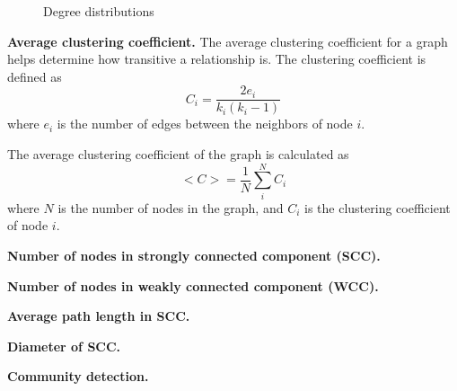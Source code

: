 \begin{figure}
    \qquad
    \caption{Degree distributions}
    \label{fig:4}
\end{figure}

\textbf{Average clustering coefficient.} The average clustering coefficient for a graph helps determine how transitive a relationship is. The clustering coefficient is defined as
\begin{equation}
    C_i = \frac{2e_i}{k_i(k_i-1)}
    \label{equation:clustering_coef}
\end{equation}
where $e_i$ is the number of edges between the neighbors of node $i$.

The average clustering coefficient of the graph is calculated as
\begin{equation}
    <C> = \frac{1}{N}\sum_{i}^{N}C_i
\end{equation}
where $N$ is the number of nodes in the graph, and $C_i$ is the clustering coefficient of node $i$.

\textbf{Number of nodes in strongly connected component (SCC).}

\textbf{Number of nodes in weakly connected component (WCC).}

\textbf{Average path length in SCC.}

\textbf{Diameter of SCC.}

\textbf{Community detection.}

